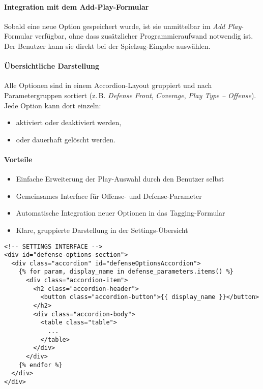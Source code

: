 \documentclass[12pt]{article}
\begin{document}
\paragraph{Integration mit dem Add-Play-Formular}%
Sobald eine neue Option gespeichert wurde, ist sie unmittelbar im \textit{Add Play}-Formular verfügbar, ohne dass zusätzlicher Programmieraufwand notwendig ist. Der Benutzer kann sie direkt bei der Spielzug-Eingabe auswählen.

\paragraph{Übersichtliche Darstellung}%
Alle Optionen sind in einem Accordion-Layout gruppiert und nach Parametergruppen sortiert (z.\,B. \textit{Defense Front}, \textit{Coverage}, \textit{Play Type – Offense}). Jede Option kann dort einzeln:
\begin{itemize}
  \item aktiviert oder deaktiviert werden,
  \item oder dauerhaft gelöscht werden.
\end{itemize}

\paragraph{Vorteile}%
\begin{itemize}
  \item Einfache Erweiterung der Play-Auswahl durch den Benutzer selbst
  \item Gemeinsames Interface für Offense- und Defense-Parameter
  \item Automatische Integration neuer Optionen in das Tagging-Formular
  \item Klare, gruppierte Darstellung in der Settings-Übersicht
\end{itemize}


\begin{verbatim}
<!-- SETTINGS INTERFACE -->
<div id="defense-options-section">
  <div class="accordion" id="defenseOptionsAccordion">
    {% for param, display_name in defense_parameters.items() %}
      <div class="accordion-item">
        <h2 class="accordion-header">
          <button class="accordion-button">{{ display_name }}</button>
        </h2>
        <div class="accordion-body">
          <table class="table">
            ...
          </table>
        </div>
      </div>
    {% endfor %}
  </div>
</div>
\end{verbatim}
\end{document}

